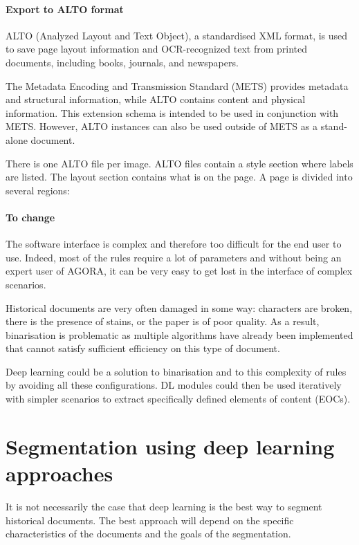 \documentclass{polytech/polytech}
\numberwithin{figure}{chapter}
\begin{document}
\paragraph{Export to ALTO format}

ALTO (Analyzed Layout and Text Object), a standardised XML format, is used to save page layout information and OCR-recognized text from printed documents, including books, journals, and newspapers.

The Metadata Encoding and Transmission Standard (METS) provides metadata and structural information, while ALTO contains content and physical information.
This extension schema is intended to be used in conjunction with METS.
However, ALTO instances can also be used outside of METS as a stand-alone document.

There is one ALTO file per image.
ALTO files contain a style section where labels are listed.
The layout section contains what is on the page.
A page is divided into several regions:

\label{margins}

\paragraph{To change}

The software interface is complex and therefore too difficult for the end user to use.
Indeed, most of the rules require a lot of parameters and without being an expert user of AGORA, it can be very easy to get lost in the interface of complex scenarios.

Historical documents are very often damaged in some way: characters are broken, there is the presence of stains, or the paper is of poor quality.
As a result, binarisation is problematic as multiple algorithms have already been implemented that cannot satisfy sufficient efficiency on this type of document.

Deep learning could be a solution to binarisation and to this complexity of rules by avoiding all these configurations.
DL modules could then be used iteratively with simpler scenarios to extract specifically defined elements of content (EOCs).


\section{Segmentation using deep learning approaches}

It is not necessarily the case that deep learning is the best way to segment historical documents.
The best approach will depend on the specific characteristics of the documents and the goals of the segmentation.
\end{document}
